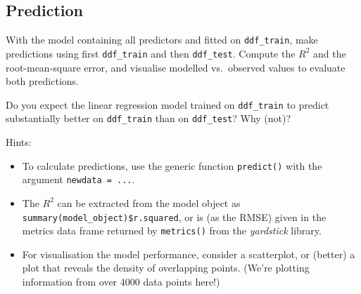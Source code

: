 \documentclass[
]{book}
\providecommand{\tightlist}{%
  \setlength{\itemsep}{0pt}\setlength{\parskip}{0pt}}
\begin{document}
\hypertarget{prediction-3}{%
\subsection{Prediction}\label{prediction-3}}

With the model containing all predictors and fitted on \texttt{ddf\_train}, make predictions using first \texttt{ddf\_train} and then \texttt{ddf\_test}. Compute the \(R^2\) and the root-mean-square error, and visualise modelled vs.~observed values to evaluate both predictions.

Do you expect the linear regression model trained on \texttt{ddf\_train} to predict substantially better on \texttt{ddf\_train} than on \texttt{ddf\_test}? Why (not)?

Hints:

\begin{itemize}
\tightlist
\item
  To calculate predictions, use the generic function \texttt{predict()} with the argument \texttt{newdata\ =\ ...}.
\item
  The \(R^2\) can be extracted from the model object as \texttt{summary(model\_object)\$r.squared}, or is (as the RMSE) given in the metrics data frame returned by \texttt{metrics()} from the \emph{yardstick} library.
\item
  For visualisation the model performance, consider a scatterplot, or (better) a plot that reveals the density of overlapping points. (We're plotting information from over 4000 data points here!)
\end{itemize}
\end{document}

